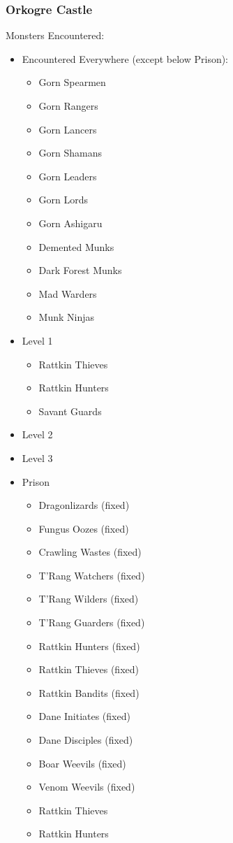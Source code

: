 \documentclass[12pt]{article}
\providecommand{\tightlist}{%
  \setlength{\itemsep}{0pt}\setlength{\parskip}{0pt}}
\begin{document}
\subsubsection{Orkogre Castle}\label{orkogre-castle}

Monsters Encountered:

\begin{multicols}{2}
\begin{itemize}
\item Encountered Everywhere (except below Prison):

\begin{itemize}
\tightlist
\item
  Gorn Spearmen
\item
  Gorn Rangers
\item
  Gorn Lancers
\item
  Gorn Shamans
\item
  Gorn Leaders
\item
  Gorn Lords
\item
  Gorn Ashigaru
\item
  Demented Munks
\item
  Dark Forest Munks
\item
  Mad Warders
\item
  Munk Ninjas
\end{itemize}

\item Level 1

\begin{itemize}
\tightlist
\item
  Rattkin Thieves
\item
  Rattkin Hunters
\item
  Savant Guards
\end{itemize}

\item Level 2

\item Level 3

\item Prison

\begin{itemize}
\tightlist
\item
  Dragonlizards (fixed)
\item
  Fungus Oozes (fixed)
\item
  Crawling Wastes (fixed)
\item
  T'Rang Watchers (fixed)
\item
  T'Rang Wilders (fixed)
\item
  T'Rang Guarders (fixed)
\item
  Rattkin Hunters (fixed)
\item
  Rattkin Thieves (fixed)
\item
  Rattkin Bandits (fixed)
\item
  Dane Initiates (fixed)
\item
  Dane Disciples (fixed)
\item
  Boar Weevils (fixed)
\item
  Venom Weevils (fixed)
\item
  Rattkin Thieves
\item
  Rattkin Hunters
\end{itemize}


\end{itemize}
\end{multicols}
\end{document}
